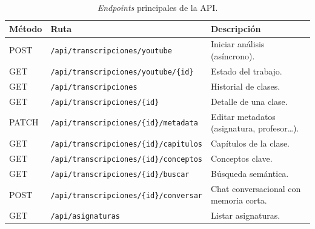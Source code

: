 \begin{longtable}{p{1.5cm}p{6.5cm}p{5cm}}
  \caption{\textit{Endpoints} principales de la API.}\label{tab:endpoints}\\
  \toprule
  \textbf{Método} & \textbf{Ruta} & \textbf{Descripción} \\
  \midrule
  \endhead
  POST & \texttt{/api/transcripciones/youtube} & Iniciar análisis (asíncrono). \\
  GET & \texttt{/api/transcripciones/youtube/\{id\}} & Estado del trabajo. \\
  GET & \texttt{/api/transcripciones} & Historial de clases. \\
  GET & \texttt{/api/transcripciones/\{id\}} & Detalle de una clase. \\
  PATCH & \texttt{/api/transcripciones/\{id\}/metadata} & Editar metadatos (asignatura, profesor\ldots). \\
  GET & \texttt{/api/transcripciones/\{id\}/capitulos} & Capítulos de la clase. \\
  GET & \texttt{/api/transcripciones/\{id\}/conceptos} & Conceptos clave. \\
  GET & \texttt{/api/transcripciones/\{id\}/buscar} & Búsqueda semántica. \\
  POST & \texttt{/api/transcripciones/\{id\}/conversar} & Chat conversacional con memoria corta. \\
  GET & \texttt{/api/asignaturas} & Listar asignaturas. \\
  \bottomrule
\end{longtable}
